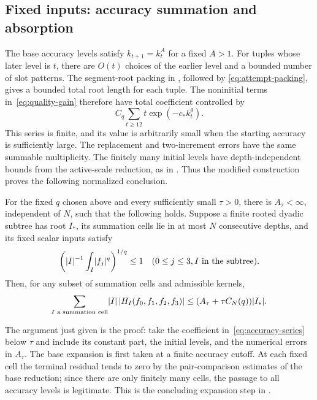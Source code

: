 \subsection{Fixed inputs: accuracy summation and absorption}
The base accuracy levels satisfy $k_{t+1}=k_t^A$ for a fixed $A>1$.
For tuples whose later level is $t$, there are $O(t)$ choices of
the earlier level and a bounded number of slot patterns.
The segment-root packing in \cite[Section~5]{H}, followed by
\eqref{eq:attempt-packing}, gives a bounded total root length for
each tuple. The noninitial terms in~\eqref{eq:quality-gain} therefore
have total coefficient controlled by
\begin{equation}\label{eq:accuracy-series}
 C_q\sum_{t\ge12}t\exp(-c_*k_t^\theta).
\end{equation}
This series is finite, and its value is arbitrarily small when the
starting accuracy is sufficiently large. The replacement and
two-increment errors have the same summable multiplicity.
The finitely many initial levels have depth-independent bounds from
the active-scale reduction, as in \cite[Section~10.4]{H}.
Thus the modified construction proves the following normalized
conclusion.

\begin{proposition}\label{prop:absorption}
For the fixed $q$ chosen above and every sufficiently small
$\tau>0$, there is $A_\tau<\infty$, independent of $N$, such that
the following holds. Suppose a finite rooted dyadic subtree has root
$I_*$, its summation cells lie in at most $N$ consecutive depths,
and its fixed scalar inputs satisfy
\[
 \left(\lvert I\rvert^{-1}\int_I\lvert f_j\rvert^q\right)^{1/q}\le1
 \quad(0\le j\le3, I\text{ in the subtree}).
\]
Then, for any subset of summation cells and admissible kernels,
\[
 \sum_{I\text{ a summation cell}}\lvert I\rvert\,\lvert H_I(f_0,f_1,f_2,f_3)\rvert
 \le (A_\tau+\tau C_N(q))\lvert I_*\rvert.
\]
\end{proposition}

The argument just given is the proof: take the coefficient
in~\eqref{eq:accuracy-series} below $\tau$ and include its constant
part, the initial levels, and the numerical errors in $A_\tau$.
The base expansion is first taken at a finite accuracy cutoff.
At each fixed cell the terminal residual tends to zero by the
pair-comparison estimates of the base reduction; since there are
only finitely many cells, the passage to all accuracy levels is
legitimate. This is the concluding expansion step in
\cite[Section~10.4]{H}.

